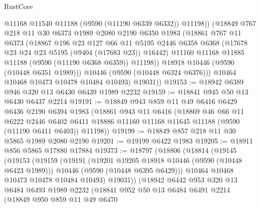 \begin{lexlean}{RustCore}
\begin{coremodule}
                @11168
                @11540
                @11188
                (@9590 (@11190 @6339 @6332))
                @11198))
            (@18849
              @767
              @218
              @11
              @30
              @6373
              @1989
              @2080
              @2190
              @6350
              @1983
              (@18861
                @767
                @11
                @6373
                (@18867
                  @196
                  @23
                  @127
                  @66
                  @11
                  @5195
                  @2446
                  @6358
                  @6368
                  (@17678 @23 @24 @23 @5195 (@9404 (@17683 @23)) @16442)
                  @11160
                  @11168
                  @11885
                  @11188
                  (@9590 (@11190 @6368 @6359))
                  @11198))
              @18918
              @10446
              (@9590 (@10448 @6351 @1989)))
            @10446
            (@9590 (@10448 @6324 @6376)))
          @10464
          @10468
          @10473
          @10478
          @10484
          @10493)
        @19031))
@19153 := @18942 @6389 @946 @320 @13 @6430 @6439 @1989 @2232
@19159 := @18841 @945 @50 @13 @6430 @6437 @2214
@19191 := @18849
    @943
    @859
    @11
    @49
    @6416
    @6429
    @6436
    @2190
    @6394
    @1983
    (@18861
      @943
      @11
      @6416
      (@18869
        @46
        @66
        @11
        @6222
        @2446
        @6402
        @6411
        @18886
        @11160
        @11168
        @11645
        @11188
        (@9590 (@11190 @6411 @6403))
        @11198))
@19199 := @18849 @857 @218 @11 @30 @5865 @1989 @2080 @2190
@19201 := @19199 @6422 @1983
@19205 := @18911 @856 @5865 @17880 @17884
@19373 := @18797
    (@18806
      (@18814
        (@19145
          (@19153
            (@19159
              (@19191
                (@19201 @19205 @18918 @10446 (@9590 (@10448 @6423 @1989)))
                @10446
                (@9590 (@10448 @6395 @6429)))
              @10464
              @10468
              @10473
              @10478
              @10484
              @10493)
            @19031))
        (@18942
          @6442
          @953
          @320
          @13
          @6484
          @6493
          @1989
          @2232
          (@18841
            @952
            @50
            @13
            @6484
            @6491
            @2214
            (@18849
              @950
              @859
              @11
              @49
              @6470

\end{coremodule}
\end{lexlean}
